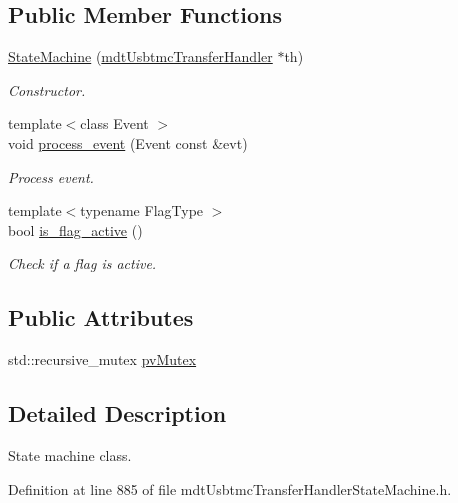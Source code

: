 \subsection*{Public Member Functions}
\begin{DoxyCompactItemize}
\item 
\hyperlink{structmdt_usbtmc_transfer_handler_state_machine_1_1_state_machine_a208e4b6a0bcb23ef3c842a9701b5ced6}{State\-Machine} (\hyperlink{classmdt_usbtmc_transfer_handler}{mdt\-Usbtmc\-Transfer\-Handler} $\ast$th)
\begin{DoxyCompactList}\small\item\em Constructor. \end{DoxyCompactList}\item 
{\footnotesize template$<$class Event $>$ }\\void \hyperlink{structmdt_usbtmc_transfer_handler_state_machine_1_1_state_machine_a73874953ff773c30a76f085012923745}{process\-\_\-event} (Event const \&evt)
\begin{DoxyCompactList}\small\item\em Process event. \end{DoxyCompactList}\item 
{\footnotesize template$<$typename Flag\-Type $>$ }\\bool \hyperlink{structmdt_usbtmc_transfer_handler_state_machine_1_1_state_machine_acc67b6da1a9eb02ac2c4278e61372930}{is\-\_\-flag\-\_\-active} ()
\begin{DoxyCompactList}\small\item\em Check if a flag is active. \end{DoxyCompactList}\end{DoxyCompactItemize}
\subsection*{Public Attributes}
\begin{DoxyCompactItemize}
\item 
std\-::recursive\-\_\-mutex \hyperlink{structmdt_usbtmc_transfer_handler_state_machine_1_1_state_machine_a94ad4d53b86e8f948661fd67b85ee7c4}{pv\-Mutex}
\end{DoxyCompactItemize}


\subsection{Detailed Description}
State machine class. 

Definition at line 885 of file mdt\-Usbtmc\-Transfer\-Handler\-State\-Machine.\-h.



